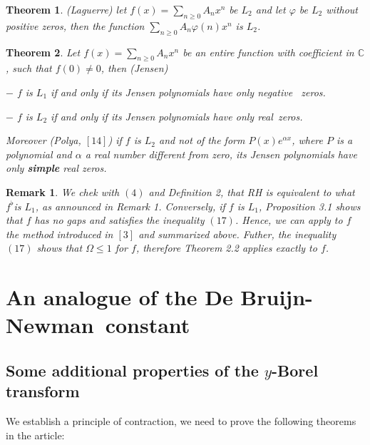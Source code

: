 \documentclass{article}
\newtheorem{theorem}{Theorem}[section]
\newtheorem{remark}{Remark}
\begin{document}
\begin{theorem}
\bigskip (Laguerre) let $f\left( x\right) =\sum_{n\geq 0}A_{n}x^{n}$ be $L_{2}$ and let $\varphi $ be $L_{2}$ without positive zeros, then the
function $\sum_{n\geq 0}A_{n}\varphi \left( n\right) x^{n}$ is $L_{2}$.
\end{theorem}

\begin{theorem}
\bigskip Let $f\left( x\right) =\sum_{n\geq 0}A_{n}x^{n}$ be an entire
function with coefficient in $\mathbb{C}$, such that $f\left( 0\right) \neq 0
$, then (Jensen)

$-$ $f$ is $L_{1}$ if and only if its Jensen polynomials have only negative
\ zeros.

$-$ $f$ is $L_{2}$ if and only if its Jensen polynomials have only real\
zeros.

Moreover (Polya, $\left[ 14\right] $) if $f$ is $L_{2}$ and not of the form $P\left( x\right) e^{\alpha x}$, where $P$ is a polynomial and $\alpha $ a
real number different from zero, its Jensen polynomials have only \textbf{simple} real zeros.\bigskip 
\end{theorem}

\begin{remark}
\bigskip We chek with $\left( 4\right) $ and Definition 2, that RH is
equivalent to what $f^{\flat }$is $L_{1}$, as announced in Remark 1.
Conversely, if $f$ is $L_{1}$, Proposition 3.1 shows that $f$ has no gaps
and satisfies the inequality $\left( 17\right) $. Hence, we can apply to $f$
the method introduced in $\left[ 3\right] $ and summarized above. Futher,
the inequality $\left( 17\right) $ shows that $\Omega \leq 1$ for $f$,
therefore Theorem 2.2 applies exactly to $f$.
\end{remark}

\bigskip

\section{An analogue of the De Bruijn-Newman\textbf{\ constant}}

\bigskip

\subsection{\protect\bigskip Some additional properties of the $y$-Borel
transform}

We establish a principle of contraction, we need to prove the following
theorems in the article:
\end{document}
